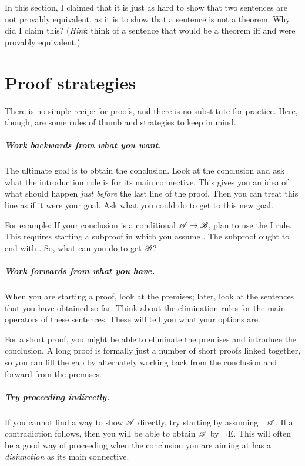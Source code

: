 \problempart In this section, I claimed that it is just as hard to show that two sentences are not provably equivalent, as it is to show that a sentence is not a theorem. Why did I claim this? (\emph{Hint}: think of a sentence that would be a theorem iff  and  were provably equivalent.)





\chapter{Proof strategies}\label{c:proof.strat}
There is no simple recipe for proofs, and there is no substitute for practice. Here, though, are some rules of thumb and strategies to keep in mind.

\paragraph{Work backwards from what you want.}
The ultimate goal is to obtain the conclusion. Look at the conclusion and ask what the introduction rule is for its main connective. This gives you an idea of what should happen \emph{just before} the last line of the proof. Then you can treat this line as if it were your goal. Ask what you could do to get to this new goal.

For example: If your conclusion is a conditional $\mathscr{A}\rightarrow\mathscr{B}$, plan to use the {\eif}I rule. This requires starting a subproof in which you assume . The subproof ought to end with . So, what can you do to get $\mathscr{B}$?


\paragraph{Work forwards from what you have.}
When you are starting a proof, look at the premises; later, look at the sentences that you have obtained so far. Think about the elimination rules for the main operators of these sentences. These will tell you what your options are.

For a short proof, you might be able to eliminate the premises and introduce the conclusion. A long proof is formally just a number of short proofs linked together, so you can fill the gap by alternately working back from the conclusion and forward from the premises.

\paragraph{Try proceeding indirectly.}
If you cannot find a way to show $\mathscr{A}$ directly, try starting by assuming $\neg \mathscr{A}$. If a contradiction follows, then you will be able to obtain $\mathscr{A}$ by $\neg$E. This will often be a good way of proceeding when the conclusion you are aiming at has a \emph{disjunction} as its main connective.  


